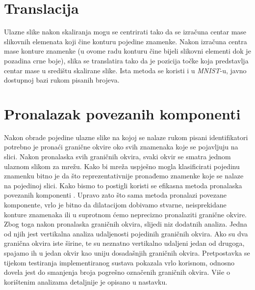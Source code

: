 \documentclass[times, utf8, diplomski]{fer}
\theoremstyle{definition}
\begin{document}
\section{Translacija}
Ulazne slike nakon skaliranja mogu se centrirati tako da se izračuna centar mase slikovnih elemenata koji čine konturu pojedine znamenke. Nakon izračuna centra mase konture znamenke (u ovome radu konturu čine bijeli slikovni elementi dok je pozadina crne boje), slika se translatira tako da je pozicija točke koja predstavlja centar mase u središtu skalirane slike. Ista metoda se koristi i u \textit{MNIST}-u, javno dostupnoj bazi rukom pisanih brojeva.
\section{Pronalazak povezanih komponenti}
Nakon obrade pojedine ulazne slike na kojoj se nalaze rukom pisani identifikatori potrebno je pronaći granične okvire oko svih znamenaka koje se pojavljuju na slici. Nakon pronalaska svih graničnih okvira, svaki okvir se smatra jednom ulaznom slikom za mrežu. Kako bi mreža uspješno mogla klasificirati pojedinu znamenku bitno je da što reprezentativnije pronađemo znamenke koje se nalaze na pojedinoj slici. Kako bismo to postigli koristi se efikasna metoda pronalaska povezanih komponenti . Upravo zato što sama metoda pronalazi povezane komponente, vrlo je bitno da dilatacijom dobivamo stvarne, neisprekidane konture znamenaka ili u suprotnom ćemo neprecizno pronalaziti granične okvire. Zbog toga nakon pronalaska graničnih okvira, slijedi niz dodatnih analiza. Jedna od njih jest  vertikalna analiza udaljenosti pojedinih graničnih okvira. Ako su dva granična okvira iste širine, te su neznatno vertikalno udaljeni jedan od drugoga, spajamo ih u jedan okvir kao uniju dosadašnjih graničnih okvira. Pretpostavka se tijekom testiranja implementiranog sustava pokazala vrlo korisnom, odnosno dovela jest do smanjenja broja pogrešno označenih graničnih okvira. Više o korištenim analizama detaljnije je opisano u nastavku. \newline\newline
\end{document}

